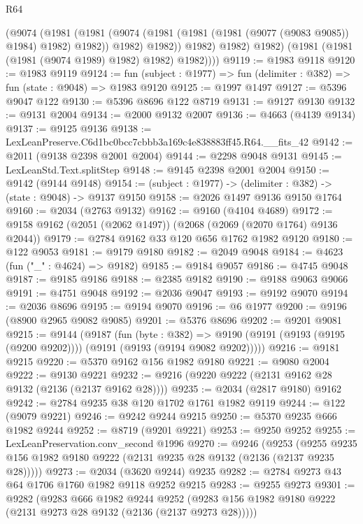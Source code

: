\begin{lexlean}{R64}
\begin{coremodule}
                (@9074
                  (@1981
                    (@1981
                      (@9074 (@1981 (@1981 (@1981 (@9077 (@9083 @9085)) @1984) @1982) @1982))
                      @1982)
                    @1982))
                @1982)
              @1982)
            @1982)
          (@1981 (@1981 (@1981 (@9074 @1989) @1982) @1982) @1982))))
@9119 := @1983 @9118
@9120 := @1983 @9119
@9124 := fun (subject : @1977) => fun (delimiter : @382) => fun (state : @9048) => @1983 @9120
@9125 := @1997 @1497
@9127 := @5396 @9047 @122
@9130 := @5396 @8696 @122 @8719
@9131 := @9127 @9130
@9132 := @9131 @2004
@9134 := @2000 @9132 @2007
@9136 := @4663 (@4139 @9134)
@9137 := @9125 @9136
@9138 := LexLeanPreserve.C6d1bc0bcc7cbbb3a169c4e838883ff45.R64.__fits_42
@9142 := @2011 (@9138 @2398 @2001 @2004)
@9144 := @2298 @9048 @9131
@9145 := LexLeanStd.Text.splitStep
@9148 := @9145 @2398 @2001 @2004
@9150 := @9142 (@9144 @9148)
@9154 := (subject : @1977) -> (delimiter : @382) -> (state : @9048) -> @9137 @9150
@9158 := @2026 @1497 @9136 @9150 @1764
@9160 := @2034 (@2763 @9132)
@9162 := @9160 (@4104 @4689)
@9172 := @9158 @9162 (@2051 (@2062 @1497)) (@2068 (@2069 (@2070 @1764) @9136 @2044))
@9179 := @2784 @9162 @33 @120 @656 @1762 @1982 @9120
@9180 := @122 @9053
@9181 := @9179 @9180
@9182 := @2049 @9048
@9184 := @4623 (fun ("_" : @4624) => @9182)
@9185 := @9184 @9057
@9186 := @4745 @9048
@9187 := @9185 @9186
@9188 := @2385 @9182
@9190 := @9188 @9063 @9066
@9191 := @4751 @9048
@9192 := @2036 @9047
@9193 := @9192 @9070
@9194 := @2036 @8696
@9195 := @9194 @9070
@9196 := @6 @1977
@9200 := @9196 (@8900 @2965 @9082 @9085)
@9201 := @5376 @8696
@9202 := @9201 @9081
@9215 := @9144
    (@9187
      (fun (byte : @382) =>
      @9190 (@9191 (@9193 (@9195 (@9200 @9202)))) (@9191 (@9193 (@9194 @9082 @9202)))))
@9216 := @9181 @9215
@9220 := @5370 @9162 @156 @1982 @9180
@9221 := @9080 @2004
@9222 := @9130 @9221
@9232 := @9216 (@9220 @9222 (@2131 @9162 @28 @9132 (@2136 (@2137 @9162 @28))))
@9235 := @2034 (@2817 @9180) @9162
@9242 := @2784 @9235 @38 @120 @1702 @1761 @1982 @9119
@9244 := @122 (@9079 @9221)
@9246 := @9242 @9244 @9215
@9250 := @5370 @9235 @666 @1982 @9244
@9252 := @8719 (@9201 @9221)
@9253 := @9250 @9252
@9255 := LexLeanPreservation.conv_second @1996
@9270 := @9246
    (@9253 (@9255 @9235 @156 @1982 @9180 @9222 (@2131 @9235 @28 @9132 (@2136 (@2137 @9235 @28)))))
@9273 := @2034 (@3620 @9244) @9235
@9282 := @2784 @9273 @43 @64 @1706 @1760 @1982 @9118 @9252 @9215
@9283 := @9255 @9273
@9301 := @9282
    (@9283
      @666
      @1982
      @9244
      @9252
      (@9283 @156 @1982 @9180 @9222 (@2131 @9273 @28 @9132 (@2136 (@2137 @9273 @28)))))

\end{coremodule}
\end{lexlean}
